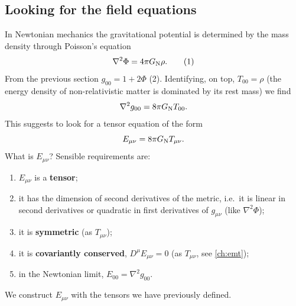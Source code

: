 \subsection{Looking for the field equations}
In Newtonian mechanics the gravitational potential is determined by the mass density through Poisson's equation
\begin{equation}
  \nabla^2\Phi=4\pi G_{\mathrm N}\rho .\tag{1}
\end{equation}
From the previous section $g_{00}=1+2\Phi$ (2). Identifying, on top, $T_{00}=\rho$ (the energy density of non-relativistic matter is dominated by its rest mass) we find
\begin{equation}
  \nabla^2g_{00}=8\pi G_{\mathrm N} T_{00}.
\end{equation}
This suggests to look for a tensor equation of the form
\begin{equation}
  E_{\mu\nu}=8\pi G_{\mathrm N} T_{\mu\nu}.
\end{equation}
What is $E_{\mu\nu}$? Sensible requirements are:
\begin{enumerate}
\item $E_{\mu\nu}$ is a \textbf{tensor};
\item it has the dimension of second derivatives of the metric, i.e.\ it is linear in second derivatives or quadratic in first derivatives of $g_{\mu\nu}$ (like $\nabla^2\Phi$);
\item it is \textbf{symmetric} (as $T_{\mu\nu}$);
\item it is \textbf{covariantly conserved}, $D^\mu E_{\mu\nu}=0$ (as $T_{\mu\nu}$, see \cref{ch:emt});
\item in the Newtonian limit, $E_{00}=\nabla^2g_{00}$.
\end{enumerate}
We construct $E_{\mu\nu}$ with the tensors we have previously defined.
